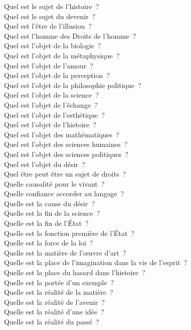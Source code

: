 \documentclass[a4paper,12pt]{article}
\begin{document}
Quel est le sujet de l'histoire ? \\
Quel est le sujet du devenir ? \\
Quel est l'être de l'illusion ? \\
Quel est l'homme des Droits de l'homme ? \\
Quel est l'objet de la biologie ? \\
Quel est l'objet de la métaphysique ? \\
Quel est l'objet de l'amour ? \\
Quel est l'objet de la perception ? \\
Quel est l'objet de la philosophie politique ? \\
Quel est l'objet de la science ? \\
Quel est l'objet de l'échange ? \\
Quel est l'objet de l'esthétique ? \\
Quel est l'objet de l'histoire ? \\
Quel est l'objet des mathématiques ? \\
Quel est l'objet des sciences humaines ? \\
Quel est l'objet des sciences politiques ? \\
Quel est l'objet du désir ? \\
Quel être peut être un sujet de droits ? \\
Quelle causalité pour le vivant ? \\
Quelle confiance accorder au langage ? \\
Quelle est la cause du désir ? \\
Quelle est la fin de la science ? \\
Quelle est la fin de l'État ? \\
Quelle est la fonction première de l'État ? \\
Quelle est la force de la loi ? \\
Quelle est la matière de l'œuvre d'art ? \\
Quelle est la place de l'imagination dans la vie de l'esprit ? \\
Quelle est la place du hasard dans l'histoire ? \\
Quelle est la portée d'un exemple ? \\
Quelle est la réalité de la matière ? \\
Quelle est la réalité de l'avenir ? \\
Quelle est la réalité d'une idée ? \\
Quelle est la réalité du passé ? \\
\end{document}
